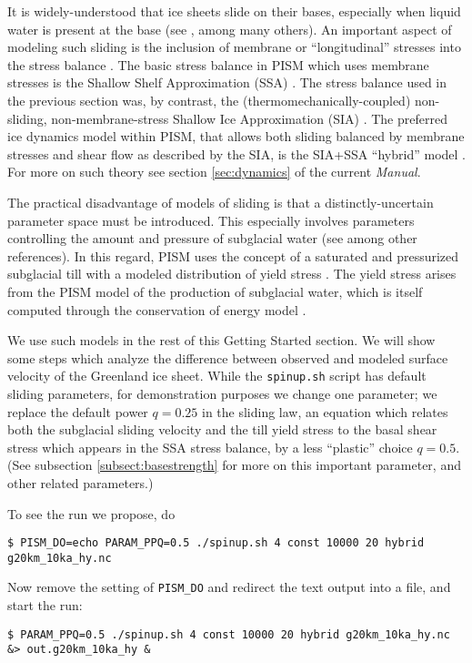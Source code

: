 It is widely-understood that ice sheets slide on their bases, especially when liquid water is present at the base (see \cite{Joughinetal2001,MacAyeal}, among many others).  An important aspect of modeling such sliding is the inclusion of membrane or ``longitudinal'' stresses into the stress balance \cite{BBssasliding}.  The basic stress balance in PISM which uses membrane stresses is the Shallow Shelf Approximation (SSA) \cite{WeisGreveHutter}.  The stress balance used in the previous section was, by contrast, the (thermomechanically-coupled) non-sliding, non-membrane-stress Shallow Ice Approximation (SIA) \cite{BBL,EISMINT00}.  The preferred ice dynamics model within PISM, that allows both sliding balanced by membrane stresses and shear flow as described by the SIA, is the SIA+SSA ``hybrid'' model \cite{BBssasliding,Winkelmannetal2011}.  For more on such theory see section \ref{sec:dynamics} of the current \emph{Manual}.

The practical disadvantage of models of sliding is that a distinctly-uncertain parameter space must be introduced.  This especially involves parameters controlling the amount and pressure of subglacial water (see \cite{AschwandenAdalgeirsdottirKhroulev,Clarke05,Tulaczyketal2000,vanPeltOerlemans2012} among other references).  In this regard, PISM uses the concept of a saturated and pressurized subglacial till with a modeled distribution of yield stress  \cite{BBssasliding,SchoofStream}.  The yield stress arises from the PISM model of the production of subglacial water, which is itself computed through the conservation of energy model \cite{AschwandenBuelerKhroulevBlatter}.

We use such models in the rest of this Getting Started section.  We will show some steps which analyze the difference between observed and modeled surface velocity of the Greenland ice sheet.  While the \texttt{spinup.sh} script has default sliding parameters, for demonstration purposes we change one parameter; we replace the default power $q=0.25$ in the sliding law, an equation which relates both the subglacial sliding velocity and the till yield stress to the basal shear stress which appears in the SSA stress balance, by a less ``plastic'' choice $q=0.5$.  (See subsection \ref{subsect:basestrength} for more on this important parameter, and other related parameters.)

To see the run we propose, do
\begin{verbatim}
$ PISM_DO=echo PARAM_PPQ=0.5 ./spinup.sh 4 const 10000 20 hybrid g20km_10ka_hy.nc
\end{verbatim}
Now remove the setting of \texttt{PISM_DO} and redirect the text output into a file, and start the run:
\begin{verbatim}
$ PARAM_PPQ=0.5 ./spinup.sh 4 const 10000 20 hybrid g20km_10ka_hy.nc &> out.g20km_10ka_hy &
\end{verbatim}

